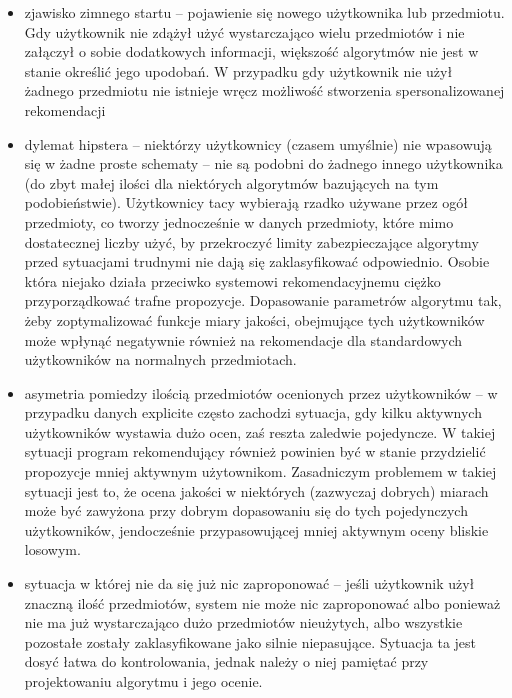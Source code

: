 \documentclass{pracamgr}
\begin{document}
   \begin{itemize}\itemsep1pt \parskip0pt 
    \item zjawisko zimnego startu -- pojawienie się nowego użytkownika lub przedmiotu.\newline
      Gdy użytkownik nie zdążył użyć wystarczająco wielu przedmiotów i nie załączył o sobie dodatkowych informacji,
      większość algorytmów nie jest w stanie określić jego upodobań.
      W przypadku gdy użytkownik nie użył żadnego przedmiotu nie istnieje wręcz możliwość stworzenia spersonalizowanej rekomendacji
    \item dylemat hipstera -- niektórzy użytkownicy (czasem umyślnie) nie wpasowują się w żadne proste schematy --
     nie są podobni do żadnego innego użytkownika (do zbyt małej ilości dla niektórych algorytmów bazujących na tym podobieństwie).\newline
     Użytkownicy tacy wybierają rzadko używane przez ogół przedmioty, co tworzy jednocześnie w danych przedmioty, które mimo dostatecznej liczby użyć,
     by przekroczyć limity zabezpieczające algorytmy przed sytuacjami trudnymi nie dają się zaklasyfikować odpowiednio.
     Osobie która niejako działa przeciwko systemowi rekomendacyjnemu ciężko przyporządkować trafne propozycje.
     Dopasowanie parametrów algorytmu tak, żeby zoptymalizować funkcje miary jakości,
     obejmujące tych użytkowników może wpłynąć negatywnie również na rekomendacje dla standardowych użytkowników na normalnych przedmiotach.
    \item asymetria pomiedzy ilością przedmiotów ocenionych przez użytkowników -- w przypadku danych explicite często zachodzi sytuacja,
     gdy kilku aktywnych użytkowników wystawia dużo ocen, zaś reszta zaledwie pojedyncze.\newline
     W takiej sytuacji program rekomendujący również powinien być w stanie przydzielić propozycje mniej aktywnym użytownikom.
     Zasadniczym problemem w takiej sytuacji jest to, że ocena jakości w niektórych (zazwyczaj dobrych)
     miarach może być zawyżona przy dobrym dopasowaniu się do tych pojedynczych użytkowników,
     jendocześnie przypasowującej mniej aktywnym oceny bliskie losowym. %
    \item sytuacja w której nie da się już nic zaproponować -- jeśli użytkownik użył znaczną ilość przedmiotów,
     system nie może nic zaproponować albo ponieważ nie ma już wystarczająco dużo przedmiotów nieużytych,
     albo wszystkie pozostałe zostały zaklasyfikowane jako silnie niepasujące.\newline
     Sytuacja ta jest dosyć łatwa do kontrolowania, jednak należy o niej pamiętać przy projektowaniu algorytmu i jego ocenie.
   \end{itemize}
\end{document}
